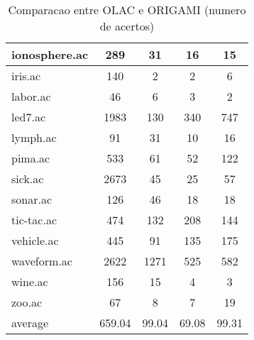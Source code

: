 \begin{table}[htbp]
\begin{tabular}{|l|c|c|c|c|}
		\hline
		ionosphere.ac   & 289           & 31                 & 16                       & 15                            \\
		\hline
		iris.ac         & 140           & 2                  & 2                        & 6                             \\
		\hline
		labor.ac        & 46            & 6                  & 3                        & 2                             \\
		\hline
		led7.ac         & 1983          & 130                & 340                      & 747                           \\
		\hline
		lymph.ac        & 91            & 31                 & 10                       & 16                            \\
		\hline
		pima.ac         & 533           & 61                 & 52                       & 122                           \\
		\hline
		sick.ac         & 2673          & 45                 & 25                       & 57                            \\
		\hline
		sonar.ac        & 126           & 46                 & 18                       & 18                            \\
		\hline
		tic-tac.ac      & 474           & 132                & 208                      & 144                           \\
		\hline
		vehicle.ac      & 445           & 91                 & 135                      & 175                           \\
		\hline
		waveform.ac     & 2622          & 1271               & 525                      & 582                           \\
		\hline
		wine.ac         & 156           & 15                 & 4                        & 3                             \\
		\hline
		zoo.ac          & 67            & 8                  & 7                        & 19                            \\
		\hline
		average         & 659.04        & 99.04              & 69.08                    & 99.31                         \\
		\hline
		\end{tabular}
	\caption{Comparacao entre OLAC e ORIGAMI (numero de acertos)}
	\label{tab:comparison_olac_origami}
\end{table}